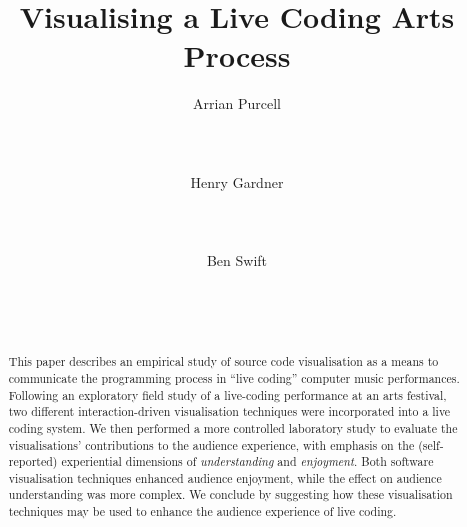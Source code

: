 \documentclass{sig-alternate}
\begin{document}

\title{Visualising a Live Coding Arts Process}

\author{
\alignauthor Arrian Purcell\\
       \\
       \\
       \\
\alignauthor Henry Gardner\\
       \\
       \\
       \\
\alignauthor Ben Swift\\
       \\
       \\
       \\
}

\maketitle
\begin{abstract}
  This paper describes an empirical study of source code visualisation
  as a means to communicate the programming process in ``live coding''
  computer music performances. Following an exploratory field study of
  a live-coding performance at an arts festival, two different
  interaction-driven visualisation techniques were incorporated into a
  live coding system. We then performed a more controlled laboratory
  study to evaluate the visualisations' contributions to the audience
  experience, with emphasis on the (self-reported) experiential
  dimensions of \emph{understanding} and \emph{enjoyment}. Both
  software visualisation techniques enhanced audience enjoyment, while
  the effect on audience understanding was more complex. We conclude
  by suggesting how these visualisation techniques may be used to
  enhance the audience experience of live coding.
\end{abstract}

\end{document}
